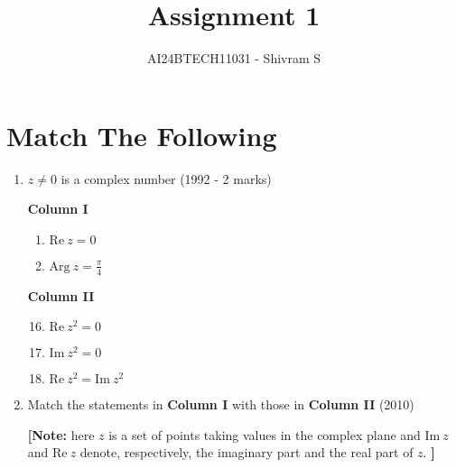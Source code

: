 \documentclass[journal]{IEEEtran}
\begin{document}

\onecolumn

\title{Assignment 1}
\author{AI24BTECH11031 - Shivram S}
\maketitle
\bigskip

\renewcommand{\thefigure}{\theenumi}
\renewcommand{\thetable}{\theenumi}
\section{Match The Following}

\begin{enumerate}
	\item $z \ne 0$ is a complex number
		\hfill (1992 - 2 marks)

		\begin{multicols}{2}
			\textbf{Column I}
			\begin{enumerate}[label=(\Alph*)]
				\item $\mathrm{Re}\ z = 0$
				\item $\mathrm{Arg}\ z = \frac{\pi}{4}$
			\end{enumerate}
			\columnbreak
			\textbf{Column II}
			\begin{enumerate}[label=(\alph*)]
					\setcounter{enumii}{15}
				\item $\mathrm{Re}\ z^2 = 0$
				\item $\mathrm{Im}\ z^2 = 0$
				\item $\mathrm{Re}\ z^2 = \mathrm{Im}\ z^2$
			\end{enumerate}
		\end{multicols}

	\item Match the statements in \textbf{Column I} with those in \textbf{Column II}
		\hfill (2010)

		\textbf{[Note:} here $z$ is a set of points taking values in the
		complex plane and $\mathrm{Im}\ z$ and $\mathrm{Re}\ z$
		denote, respectively, the imaginary part and the real part of $z$. \textbf{]}


\end{enumerate}
\end{document}
